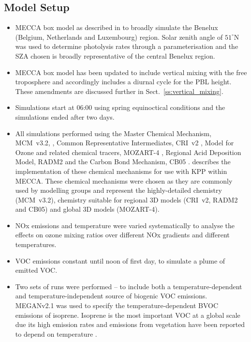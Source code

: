 \subsection{Model Setup} \label{ss:model_setup}
\begin{itemize}
    \item MECCA box model as described in \citet{Coates:2015} to broadly simulate the Benelux (Belgium, Netherlands and Luxembourg) region. Solar zenith angle of $51^{\circ}$N was used to determine photolysis rates through a parameterisation and the SZA chosen is broadly representative of the central Benelux region.
    \item MECCA box model has been updated to include vertical mixing with the free troposphere and accordingly includes a diurnal cycle for the PBL height. These amendments are discussed further in Sect.~\ref{ss:vertical_mixing}.
    \item Simulations start at 06:00 using spring equinoctical conditions and the simulations ended after two days.
    \item All simulations performed using the Master Chemical Mechanism, MCM~v3.2, \citep{MCM_Site}, Common Representative Intermediates, CRI~v2 \citep{Jenkin:2008}, Model for Ozone and related chemical tracers, MOZART-4 \citep{Emmons:2010}, Regional Acid Deposition Model, RADM2 \citep{Stockwell:1990} and the Carbon Bond Mechanism, CB05 \citep{Yarwood:2005}. \citet{Coates:2015} describes the implementation of these chemical mechanisms for use with KPP within MECCA. These chemical mechanisms were chosen as they are commonly used by modelling groups and represent the highly-detailed chemistry (MCM~v3.2), chemistry suitable for regional 3D models (CRI~v2, RADM2 and CB05) and global 3D models (MOZART-4).
    \item NOx emissions and temperature were varied systematically to analyse the effects on ozone mixing ratios over different NOx gradients and different temperatures.
    \item VOC emissions constant until noon of first day, to simulate a plume of emitted VOC.
    \item Two sets of runs were performed -- to include both a temperature-dependent and temperature-independent source of biogenic VOC emissions. MEGANv2.1 \citep{Guenther:2012} was used to specify the temperature-dependent BVOC emissions of isoprene. Isoprene is the most important VOC at a global scale due its high emission rates and emissions from vegetation have been reported to depend on temperature \citep{Guenther:2006}.

\end{itemize}
